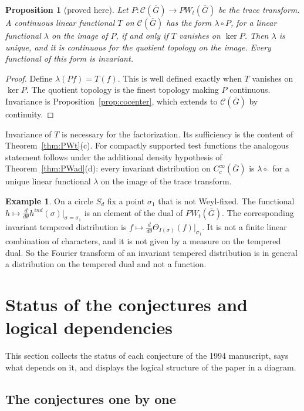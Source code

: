 \documentclass[12pt,letterpaper]{article}
\numberwithin{equation}{section}
\newtheorem{xproposition}[theorem]{Proposition}
\theoremstyle{definition}
\newtheorem{xexample}[theorem]{Example}
\newcommand{\proved}{proved here}
\newcommand{\bG}{\overline{G}}
\newcommand{\calC}{\mathcal C}
\begin{document}
\begin{xproposition}[\proved]\label{prop:factor}
Let $P:\calC(\bG)\to PW_t(\bG)$ be the trace transform.  A continuous linear functional $T$
on $\calC(\bG)$ has the form $\lambda\circ P$, for a linear functional $\lambda$ on the
image of $P$, if and only if $T$ vanishes on $\ker P$.  Then $\lambda$ is unique, and it is
continuous for the quotient topology on the image.  Every functional of this form is
invariant.
\end{xproposition}
\begin{proof}
Define $\lambda(Pf)=T(f)$.  This is well defined exactly when $T$ vanishes on $\ker P$.
The quotient topology is the finest topology making $P$ continuous.  Invariance is
Proposition~\ref{prop:cocenter}, which extends to $\calC(\bG)$ by continuity.
\end{proof}
Invariance of $T$ is necessary for the factorization.  Its sufficiency is the content of
Theorem~\ref{thm:PWt}(c).  For compactly supported test functions the analogous statement
follows under the additional density hypothesis of Theorem~\ref{thm:PWad}(d): every invariant
distribution on $C_c^\infty(\bG)$ is $\lambda\circ\hat{\ }$ for a unique linear functional
$\lambda$ on the image of the trace transform.

\begin{xexample}\label{ex:derivative}
On a circle $S_d$ fix a point $\sigma_1$ that is not Weyl-fixed.  The functional
$h\mapsto\frac{d}{d\theta}h^{ind}(\sigma)|_{\sigma=\sigma_1}$ is an element of the dual of
$PW_t(\bG)$.  The corresponding invariant tempered distribution is
$f\mapsto\frac{d}{d\theta}\Theta_{I(\sigma)}(f)|_{\sigma_1}$.  It is not a finite linear
combination of characters, and it is not given by a measure on the tempered dual.  So the
Fourier transform of an invariant tempered distribution is in general a distribution on
the tempered dual and not a function.
\end{xexample}
\section{Status of the conjectures and logical dependencies}\label{sec:status}

This section collects the status of each conjecture of the 1994 manuscript, says what
depends on it, and displays the logical structure of the paper in a diagram.

\subsection{The conjectures one by one}
\end{document}
